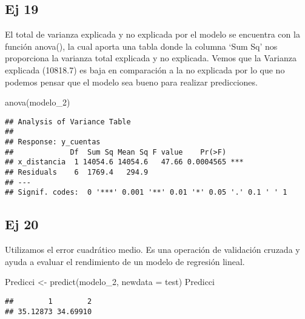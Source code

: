 \documentclass[
]{article}
\newenvironment{Shaded}{\begin{snugshade}}{\end{snugshade}}
\newcommand{\AttributeTok}[1]{\textcolor[rgb]{0.77,0.63,0.00}{#1}}
\newcommand{\DecValTok}[1]{\textcolor[rgb]{0.00,0.00,0.81}{#1}}
\newcommand{\FunctionTok}[1]{\textcolor[rgb]{0.00,0.00,0.00}{#1}}
\newcommand{\NormalTok}[1]{#1}
\newcommand{\OtherTok}[1]{\textcolor[rgb]{0.56,0.35,0.01}{#1}}
\newcommand{\SpecialCharTok}[1]{\textcolor[rgb]{0.00,0.00,0.00}{#1}}
\begin{document}
\hypertarget{ej-19}{%
\subsection{Ej 19}\label{ej-19}}

El total de varianza explicada y no explicada por el modelo se encuentra
con la función anova(), la cual aporta una tabla donde la columna `Sum
Sq' nos proporciona la varianza total explicada y no explicada. Vemos
que la Varianza explicada (10818.7) es baja en comparación a la no
explicada por lo que no podemos pensar que el modelo sea bueno para
realizar predicciones.

\begin{Shaded}
\begin{Highlighting}[]
\FunctionTok{anova}\NormalTok{(modelo\_2)}
\end{Highlighting}
\end{Shaded}

\begin{verbatim}
## Analysis of Variance Table
## 
## Response: y_cuentas
##             Df  Sum Sq Mean Sq F value    Pr(>F)    
## x_distancia  1 14054.6 14054.6   47.66 0.0004565 ***
## Residuals    6  1769.4   294.9                      
## ---
## Signif. codes:  0 '***' 0.001 '**' 0.01 '*' 0.05 '.' 0.1 ' ' 1
\end{verbatim}

\hypertarget{ej-20}{%
\subsection{Ej 20}\label{ej-20}}

Utilizamos el error cuadrático medio. Es una operación de validación
cruzada y ayuda a evaluar el rendimiento de un modelo de regresión
lineal.

\begin{Shaded}
\begin{Highlighting}[]
\NormalTok{Predicci }\OtherTok{\textless{}{-}} \FunctionTok{predict}\NormalTok{(modelo\_2, }\AttributeTok{newdata =}\NormalTok{ test) }
\NormalTok{Predicci}
\end{Highlighting}
\end{Shaded}

\begin{verbatim}
##        1        2 
## 35.12873 34.69910
\end{verbatim}

\begin{Shaded}
\end{Shaded}
\end{document}
